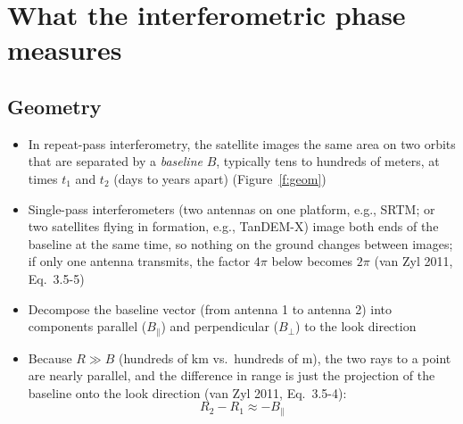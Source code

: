 \documentclass[11pt, oneside]{article}
\newcommand{\Bperp}{B_\perp}
\newcommand{\Bpar}{B_\parallel}
\begin{document}
\section{What the interferometric phase measures}
\label{s:phase}

\subsection{Geometry}

\begin{itemize}
	\item In repeat-pass interferometry, the satellite images the same area on two orbits that are separated by a \emph{baseline} $B$, typically tens to hundreds of meters, at times $t_1$ and $t_2$ (days to years apart) (Figure~\ref{f:geom})
	\item Single-pass interferometers (two antennas on one platform, e.g., SRTM; or two satellites flying in formation, e.g., TanDEM-X) image both ends of the baseline at the same time, so nothing on the ground changes between images; if only one antenna transmits, the factor $4\pi$ below becomes $2\pi$ (van Zyl 2011, Eq.~3.5-5)
	\item Decompose the baseline vector (from antenna 1 to antenna 2) into components parallel ($\Bpar$) and perpendicular ($\Bperp$) to the look direction
	\item Because $R \gg B$ (hundreds of km vs.\ hundreds of m), the two rays to a point are nearly parallel, and the difference in range is just the projection of the baseline onto the look direction (van Zyl 2011, Eq.~3.5-4):
	\begin{equation}
		\label{e:dRB}
		R_2 - R_1 \approx -\Bpar
	\end{equation}
\end{itemize}
\end{document}
